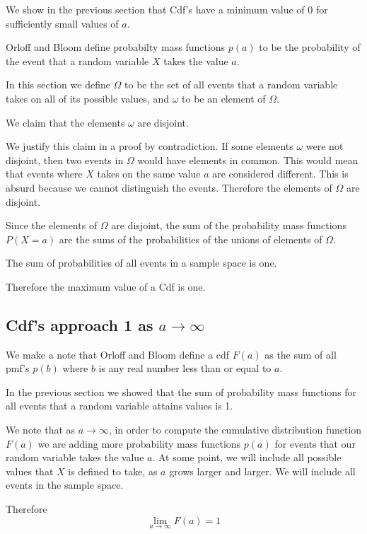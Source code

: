 \documentclass[a4paper,11pt]{article}
\begin{document}
We show in the previous section that Cdf's have a minimum value
of 0 for sufficiently small values of $a$.

Orloff and Bloom define probabilty mass functions $p \left( a \right)$
to be the probability of the event that a random variable $X$ takes 
the value $a$.

In this section we define $\Omega$ to be the set of all events
that a random variable takes on all of its possible values, and $\omega$
to be an element of $\Omega$.

We claim that the elements $\omega$ are disjoint.

We justify this claim in a proof by contradiction.  
If some elements $\omega$ were not disjoint, then two events in 
$\Omega$ would have elements in common.  This would mean that events
where $X$ takes on the same value $a$ are considered different.  This
is absurd because we cannot distinguish the events.  Therefore the
elements of $\Omega$ are disjoint.

Since the elements of $\Omega$ are disjoint, the sum of the probability
mass functions $P\left( X = a \right)$ are the sums of the probabilities
of the unions of elements of $\Omega$.

The sum of probabilities of all events in a sample space is one.

Therefore the maximum value of a Cdf is one.

\subsection{Cdf's approach 1 as $a \rightarrow \infty$}

We make a note that Orloff and Bloom define a cdf $F\left( a \right)$ 
as the sum of all pmf's $p \left( b \right)$ where $b$ is any real
number less than or equal to $a$.

In the previous section we showed that the sum of probability mass
functions for all events that a random variable attains values
is 1.

We note that as $a \rightarrow \infty$, in order to compute the
cumulative distribution function $F \left( a \right)$ we are adding
more probability mass functions $p \left( a \right)$ for events that
our random variable takes the value $a$.  At some point, we will
include all possible values that $X$ is defined to take, as $a$
grows larger and larger. We will include all events in the sample
space.

Therefore
\begin{equation}
  \lim_{a \rightarrow \infty} F \left( a \right) = 1
\end{equation}

\printbibliography{}
\end{document}
